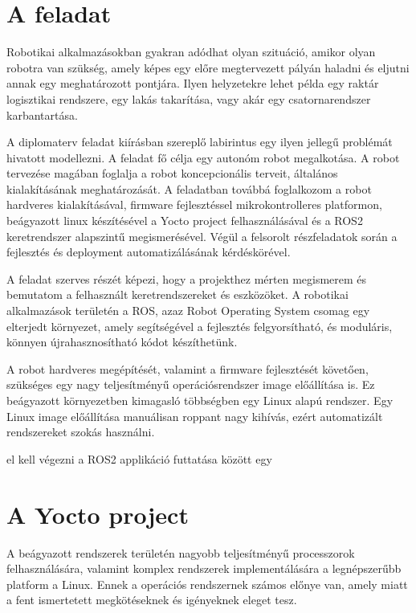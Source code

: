 \section{A feladat}

Robotikai alkalmazásokban gyakran adódhat olyan szituáció, amikor olyan robotra
van szükség, amely képes egy előre megtervezett pályán haladni és eljutni annak
egy meghatározott pontjára. Ilyen helyzetekre lehet példa egy raktár logisztikai
rendszere, egy lakás takarítása, vagy akár egy csatornarendszer karbantartása.

\medskip

A diplomaterv feladat kiírásban szereplő labirintus egy ilyen jellegű problémát
hivatott modellezni. A feladat fő célja egy autonóm robot megalkotása. A robot
tervezése magában foglalja a robot koncepcionális terveit, általános
kialakításának meghatározását. A feladatban továbbá foglalkozom a robot hardveres
kialakításával, firmware fejlesztéssel mikrokontrolleres platformon, beágyazott
linux készítésével a Yocto project felhasználásával és a ROS2 keretrendszer
alapszintű megismerésével. Végül a felsorolt részfeladatok során a fejlesztés
és deployment automatizálásának kérdéskörével.

A feladat szerves részét képezi, hogy a projekthez mérten megismerem és bemutatom
a felhasznált keretrendszereket és eszközöket. A robotikai alkalmazások területén
a ROS, azaz Robot Operating System csomag egy elterjedt környezet, amely
segítségével a fejlesztés felgyorsítható, és moduláris, könnyen újrahasznosítható
kódot készíthetünk.



A robot hardveres megépítését, valamint a firmware fejlesztését követően,
szükséges egy nagy teljesítményű operációsrendszer image előállítása is. Ez
beágyazott környezetben kimagasló többségben egy Linux alapú rendszer. Egy Linux
image előállítása manuálisan roppant nagy kihívás, ezért automatizált
rendszereket szokás használni.

el kell végezni a ROS2 applikáció futtatása között egy



\section{A Yocto project}

A beágyazott rendszerek területén nagyobb teljesítményű processzorok
felhasználására, valamint komplex rendszerek implementálására a legnépszerűbb
platform a Linux. Ennek a operációs rendszernek számos előnye van, amely miatt a
fent ismertetett megkötéseknek és igényeknek eleget tesz.

